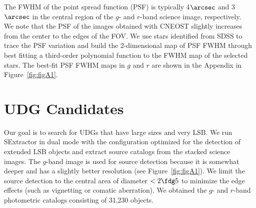 \documentclass[twocolumn,trackchanges]{aastex61}
\begin{document}
The FWHM of the point spread function (PSF) is typically 4{$\arcsec$} and 3{$\arcsec$} in the central region of the $g$- and $r$-band science image, respectively. We note that the PSF of the images obtained with CNEOST slightly increases from the center to the edges of the FOV. We use stars identified from SDSS to trace the PSF variation and build the 2-dimensional map of PSF FWHM through best fitting a third-order polynomial function to the FWHM map of the selected stars. The best-fit PSF FWHM maps in $g$ and $r$ are shown in the Appendix in Figure~\ref{fig:figA1}. 








\section{UDG Candidates} \label{sec:candidates}


Our goal is to search for UDGs that have large sizes and very LSB.  We run SExtractor \citep{BertinArnouts1996} in dual mode with the configuration optimized for the detection of extended LSB objects and extract source catalogs from the stacked science images. The $g$-band image is used for source detection because it is somewhat deeper and has a slightly better resolution (see Figure~\ref{fig:figA1}). We limit the source detection to the central area of diameter $<2\fdg5$ to minimize the edge effects (such as vignetting or comatic aberration).   We obtained the $g$- and $r$-band photometric catalogs consisting of 31,230 objects. 
%
\end{document}
